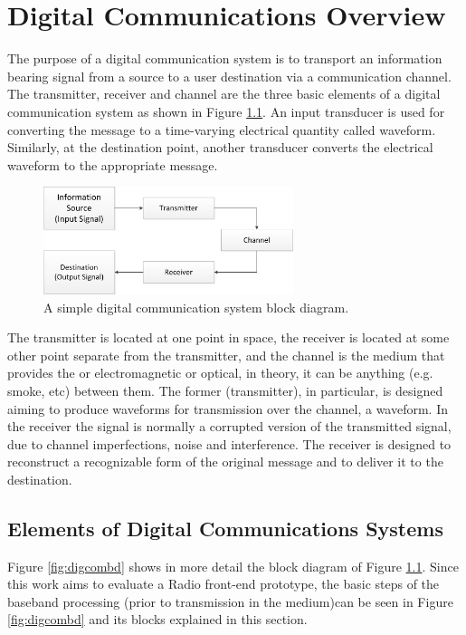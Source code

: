 \chapter{Digital Communications Overview}
\label{cap:digicomm}

The purpose of a digital communication system is to transport an information
bearing signal from a source to a user destination via a communication channel.
The transmitter, receiver and channel are the three basic elements of a digital
communication system as shown in Figure \ref{fig:digicomsimple}. An input
transducer is used for converting the message to a time-varying electrical
quantity called waveform. Similarly, at the destination point, another
transducer converts the electrical waveform to the appropriate message.


\begin{figure}[htbp]
    \centering
    \includegraphics[width=0.65\textwidth]{./figures/digicom_simple}
    \caption{ A simple digital communication system block diagram.
    \label{fig:digicomsimple}}
\end{figure}

The transmitter is located at one point in space, the receiver is located at
some other point separate from the transmitter, and the channel is the medium
that provides the or electromagnetic or optical, in theory, it can be anything
(e.g. smoke, etc) between them. The former (transmitter), in particular, is
designed aiming to produce waveforms for transmission over the channel, a
waveform. In the receiver the signal is normally a corrupted version of the
transmitted signal, due to channel imperfections, noise and interference. The
receiver is designed to reconstruct a recognizable form of the original message
and to deliver it to the destination.

\section{Elements of Digital Communications Systems}

Figure \ref{fig:digcombd} shows in more detail the block diagram of Figure
\ref{fig:digicomsimple}. Since this work aims to evaluate a Radio front-end
prototype, the basic steps of the baseband processing (prior to transmission in
the medium)can be seen in Figure \ref{fig:digcombd} and its blocks explained in
this section.

